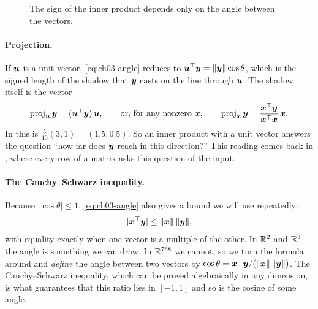 \begin{figure}[ht]
  \centering
  \caption{The sign of the inner product depends only on the angle
    between the vectors.}
  \label{fig:ch03-sign}
\end{figure}

\paragraph{Projection.}
If $\bm{u}$ is a unit vector, \cref{eq:ch03-angle} reduces to
$\bm{u}^\top \bm{y} = \|\bm{y}\| \cos \theta$, which is the signed
length of the shadow that $\bm{y}$ casts on the line through
$\bm{u}$. The shadow itself is the vector
\[
  \operatorname{proj}_{\bm{u}} \bm{y} = (\bm{u}^\top \bm{y})\,
  \bm{u},
  \qquad\text{or, for any nonzero } \bm{x},\qquad
  \operatorname{proj}_{\bm{x}} \bm{y}
  = \frac{\bm{x}^\top \bm{y}}{\bm{x}^\top \bm{x}}\, \bm{x} .
\]
In  this is $\tfrac{5}{10}(3, 1) = (1.5, 0.5)$. So an
inner product with a unit vector answers the question ``how far does
$\bm{y}$ reach in this direction?'' This reading comes back in
, where every row of a matrix asks this question
of the input.

\paragraph{The Cauchy--Schwarz inequality.}
Because $|\cos \theta| \le 1$, \cref{eq:ch03-angle} also gives a bound we
will use repeatedly:
\begin{equation}
  |\bm{x}^\top \bm{y}| \le \|\bm{x}\| \, \|\bm{y}\| ,
  \label{eq:ch03-cauchy-schwarz}
\end{equation}
with equality exactly when one vector is a multiple of the other. In
$\mathbb{R}^2$ and $\mathbb{R}^3$ the angle is something we can draw. In $\mathbb{R}^{768}$ we
cannot, so we turn the formula around and \emph{define} the angle between
two vectors by $\cos \theta = \bm{x}^\top \bm{y} / (\|\bm{x}\| \,
\|\bm{y}\|)$. The Cauchy--Schwarz inequality, which can be proved
algebraically in any dimension, is what guarantees that this ratio lies
in $[-1, 1]$ and so is the cosine of some angle.

